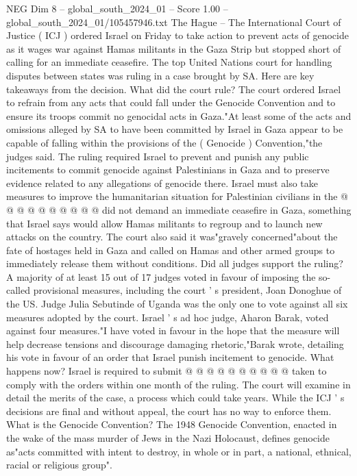 \begin{textsample}{NEG Dim 8 – global\_south\_2024\_01 – Score 1.00 – global\_south\_2024\_01/105457946.txt}  \label{ex:f8_neg_179}
The Hague -- The International Court of Justice ( ICJ ) ordered Israel on Friday to take action to prevent acts of genocide as it wages war against Hamas militants in the Gaza Strip but stopped short of calling for an immediate ceasefire.
The top United Nations court for handling disputes between states was ruling in a case brought by SA.
Here are key takeaways from the decision.
What did the court rule?
The court ordered Israel to refrain from any acts that could fall under the Genocide Convention and to ensure its troops commit no genocidal acts in Gaza."At least some of the acts and omissions alleged by SA to have been committed by Israel in Gaza appear to be capable of falling within the provisions of the ( Genocide ) Convention,"the judges said.
The ruling required Israel to prevent and punish any public incitements to commit genocide against Palestinians in Gaza and to preserve evidence related to any allegations of genocide there.
Israel must also take measures to improve the humanitarian situation for Palestinian civilians in the @ @ @ @ @ @ @ @ @ @ did not demand an immediate ceasefire in Gaza, something that Israel says would allow Hamas militants to regroup and to launch new attacks on the country.
The court also said it was"gravely concerned"about the fate of hostages held in Gaza and called on Hamas and other armed groups to immediately release them without conditions.
Did all judges support the ruling?
A majority of at least 15 out of 17 judges voted in favour of imposing the so-called provisional measures, including the court ' s president, Joan Donoghue of the US.
Judge Julia Sebutinde of Uganda was the only one to vote against all six measures adopted by the court.
Israel ' s ad hoc judge, Aharon Barak, voted against four measures."I have voted in favour in the hope that the measure will help decrease tensions and discourage damaging rhetoric,"Barak wrote, detailing his vote in favour of an order that Israel punish incitement to genocide.
What happens now?
Israel is required to submit @ @ @ @ @ @ @ @ @ @ taken to comply with the orders within one month of the ruling.
The court will examine in detail the merits of the case, a process which could take years.
While the ICJ ' s decisions are final and without appeal, the court has no way to enforce them.
What is the Genocide Convention?
The 1948 Genocide Convention, enacted in the wake of the mass murder of Jews in the Nazi Holocaust, defines genocide as"acts committed with intent to destroy, in whole or in part, a national, ethnical, racial or religious group".

\end{textsample}
